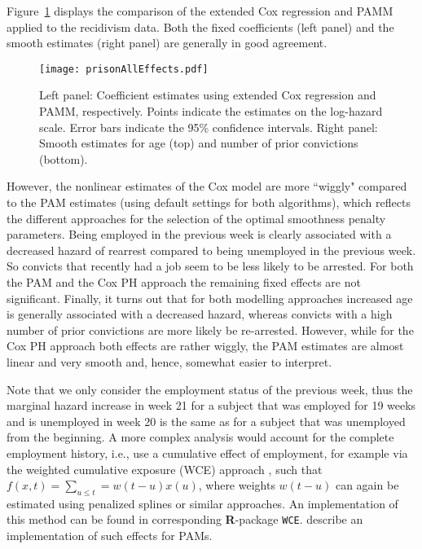 \documentclass[submit]{smj}
\newcommand{\Rlang}{\textbf{\textsf{R}}}
\newcommand{\code}[1]{{\small \texttt{#1}}}
\begin{document}
Figure~\ref{fig:prisonAllEffects} displays the
comparison of the extended Cox regression and PAMM applied to the recidivism data. Both the fixed coefficients (left panel) and the smooth estimates (right panel) are generally in good agreement.
\begin{figure}[h!]
\begin{center}
\texttt{[image: prisonAllEffects.pdf]}
\end{center}\vspace{-10pt}
\caption{Left panel: Coefficient estimates using extended Cox regression and
PAMM, respectively. Points indicate the estimates on the log-hazard scale.
Error bars indicate the 95\% confidence intervals.
Right panel: Smooth estimates for age (top) and number of prior convictions (bottom).}
\label{fig:prisonAllEffects}
\end{figure}

However, the nonlinear estimates of the Cox model are more ``wiggly" compared to the PAM estimates (using default settings for both algorithms), which reflects the different approaches for the selection of the optimal smoothness penalty parameters. Being employed in the previous week is clearly associated with a decreased hazard of rearrest compared to being unemployed in the previous week.
So convicts that recently had a job seem to be less likely to be arrested.
For both the PAM and the Cox PH approach the remaining fixed effects are not significant. Finally, it turns out that for both modelling approaches increased age is generally associated with a decreased hazard, whereas convicts with a high number of prior convictions are more likely be re-arrested. However, while for the Cox PH approach both effects are rather wiggly, the PAM estimates are almost linear and very smooth and, hence, somewhat easier to interpret.

Note that we only consider the employment status of the previous week, thus the marginal hazard increase in week 21 for a subject that was employed for 19 weeks and is unemployed in week
20 is the same as for a subject that was unemployed from the beginning.
A more complex analysis would account for the complete employment history, i.e.,
use a cumulative effect of employment, for
example via the weighted cumulative exposure (WCE) approach \citep{Sylvestre2009},
such that $f(x, t)=\sum_{u\leq t}=w(t-u)x(u)$, where weights $w(t-u)$ can again
be estimated using penalized splines or similar approaches. An implementation of
this method can be found in corresponding \Rlang-package \code{WCE}.
\cite{BenEtAl:16} describe an implementation of such effects for PAMs.
\end{document}
